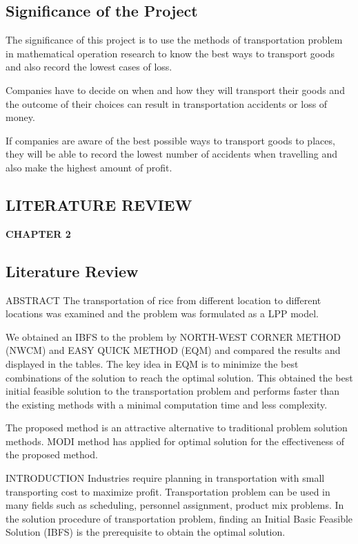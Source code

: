 \documentclass{article}
\begin{document}
\newpage

\begin{center}
\subsection{Significance of the Project}
\end{center}

The significance of this project is to use the methods of transportation problem in mathematical operation research to know the best ways to transport goods and also record the lowest cases of loss.

Companies have to decide on when and how they will transport their goods and the outcome of their choices can result in transportation accidents or loss of money. 

If companies are aware of the best possible ways to transport goods to places, they will be able to record the lowest number of accidents when travelling and also make the highest amount of profit.

\newpage

\begin{center}
	\section{LITERATURE REVIEW}
	\textbf{CHAPTER 2}
\end{center}
\subsection{Literature Review}

\noindent ABSTRACT \break
The transportation of rice from different location to different locations was examined and the problem was formulated as a LPP model.

We obtained an IBFS to the problem by NORTH-WEST
CORNER METHOD (NWCM) and EASY QUICK METHOD (EQM) and compared the results and displayed in the tables. The key idea in EQM is to minimize the best combinations of the solution to reach the optimal solution. This obtained the best initial feasible solution to the transportation problem and performs faster than the existing methods with a minimal computation time and less complexity.

The proposed method is an attractive alternative to traditional problem solution methods. MODI method has applied for optimal solution for the effectiveness of the proposed method. \break

\noindent INTRODUCTION \break
Industries require planning in transportation with small transporting cost to maximize profit. Transportation problem can be used in many fields such as scheduling, personnel assignment, product mix problems. In the solution procedure of transportation problem, finding an Initial Basic Feasible Solution (IBFS) is the prerequisite to obtain the optimal solution.
\end{document}
